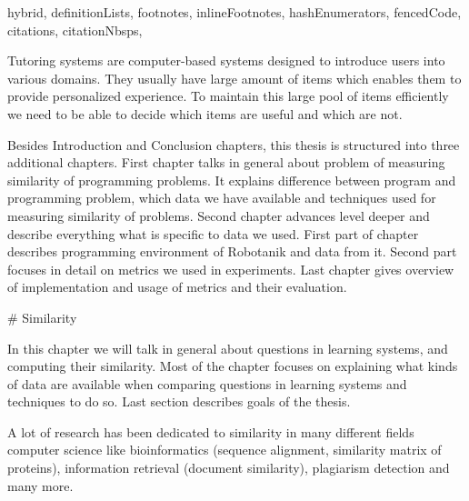 \documentclass[
  digital, %
  table,   %
  nolof,     %
  nolot,     %
  nocover
]{fithesis3}
\begin{document}
\begin{markdown*}{%
  hybrid,
  definitionLists,
  footnotes,
  inlineFootnotes,
  hashEnumerators,
  fencedCode,
  citations,
  citationNbsps,
}



Tutoring systems are computer-based systems designed to introduce users into various domains.
They usually have large amount of items which enables them to provide personalized experience. To maintain this large pool of items efficiently we need to be able to decide which items are useful and which are not.





Besides Introduction and Conclusion chapters, this thesis is structured into three additional chapters. First chapter talks in general about problem of measuring similarity of programming problems. It explains difference between program and programming problem, which data we have available and techniques used for measuring similarity of problems. Second chapter advances level deeper and describe everything what is specific to data we used. First part of chapter describes programming environment of Robotanik and data from it. Second part focuses in detail on metrics we used in experiments. Last chapter gives overview of implementation and usage of metrics and their evaluation.

# Similarity




In this chapter we will talk in general about questions in learning systems, and computing their similarity. Most of the chapter focuses on explaining what kinds of data are available when comparing questions in learning systems and techniques to do so. Last section describes goals of the thesis.


A lot of research has been dedicated to similarity in many different fields computer science like bioinformatics (sequence alignment, similarity matrix of proteins), information retrieval (document similarity), plagiarism detection and many more.


\end{markdown*}
\end{document}

